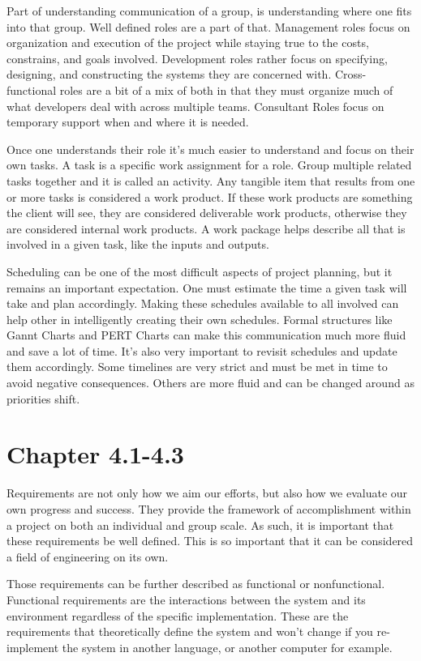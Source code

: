 \documentclass[prb,preprint]{revtex4-2}
\begin{document}
Part of understanding communication of a group, is understanding where one fits into that group. Well defined roles are a part of that. Management roles focus on organization and execution of the project while staying true to the costs, constrains, and goals involved. Development roles rather focus on specifying, designing, and constructing the systems they are concerned with. Cross-functional roles are a bit of a mix of both in that they must organize much of what developers deal with across multiple teams. Consultant Roles focus on temporary support when and where it is needed.

Once one understands their role it's much easier to understand and focus on their own tasks. A task is a specific work assignment for a role. Group multiple related tasks together and it is called an activity. Any tangible item that results from one or more tasks is considered a work product. If these work products are something the client will see, they are considered deliverable work products, otherwise they are considered internal work products. A work package helps describe all that is involved in a given task, like the inputs and outputs. 

Scheduling can be one of the most difficult aspects of project planning, but it remains an important expectation. One must estimate the time a given task will take and plan accordingly. Making these schedules available to all involved can help other in intelligently creating their own schedules. Formal structures like Gannt Charts and PERT Charts can make this communication much more fluid and save a lot of time. It's also very important to revisit schedules and update them accordingly. Some timelines are very strict and must be met in time to avoid negative consequences. Others are more fluid and can be changed around as priorities shift. 

\section*{Chapter 4.1-4.3}
Requirements are not only how we aim our efforts, but also how we evaluate our own progress and success. They provide the framework of accomplishment within a project on both an individual and group scale. As such, it is important that these requirements be well defined. This is so important that it can be considered a field of engineering on its own. 

Those requirements can be further described as functional or nonfunctional. Functional requirements are the interactions between the system and its environment regardless of the specific implementation. These are the requirements that theoretically define the system and won't change if you re-implement the system in another language, or another computer for example.
\end{document}
